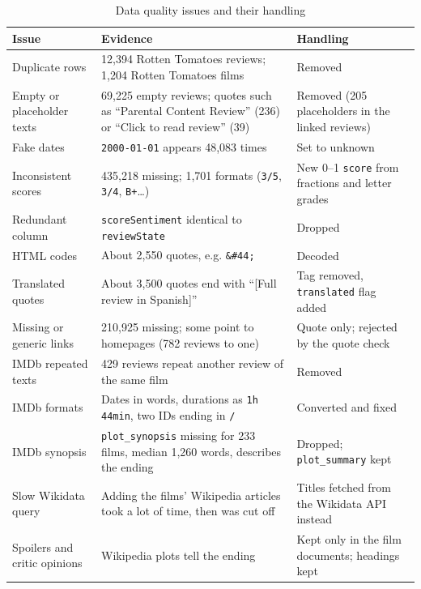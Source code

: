 \begin{table}
  \centering
  \caption{Data quality issues and their handling}
  \label{tab:quality}
  \small
  \begin{tabularx}{\textwidth}{lXX}
    \toprule
    Issue & Evidence & Handling \\
    \midrule
    Duplicate rows & 12,394 Rotten Tomatoes reviews; 1,204 Rotten Tomatoes films & Removed \\
    Empty or placeholder texts & 69,225 empty reviews; quotes such as ``Parental Content Review'' (236) or ``Click to read review'' (39) & Removed (205 placeholders in the linked reviews) \\
    Fake dates & \texttt{2000-01-01} appears 48,083 times & Set to unknown\\
    Inconsistent scores & 435,218 missing; 1,701 formats (\texttt{3/5}, \texttt{3/4}, \texttt{B+}\ldots) & New 0--1 \texttt{score} from fractions and letter grades \\
    Redundant column & \texttt{scoreSentiment} identical to \texttt{reviewState} & Dropped \\
    HTML codes & About 2,550 quotes, e.g. \texttt{\&\#44;} & Decoded \\
    Translated quotes & About 3,500 quotes end with ``[Full review in Spanish]'' & Tag removed, \texttt{translated} flag added \\
    Missing or generic links & 210,925 missing; some point to homepages (782 reviews to one) & Quote only; rejected by the quote check \\
    IMDb repeated texts & 429 reviews repeat another review of the same film & Removed \\
    IMDb formats & Dates in words, durations as \texttt{1h 44min}, two IDs ending in \texttt{/} & Converted and fixed \\
    IMDb synopsis & \texttt{plot_synopsis} missing for 233 films, median 1,260 words, describes the ending & Dropped; \texttt{plot_summary} kept \\
    Slow Wikidata query & Adding the films' Wikipedia articles took a lot of time, then was cut off & Titles fetched from the Wikidata API instead \\
    Spoilers and critic opinions & Wikipedia plots tell the ending & Kept only in the film documents; headings kept \\
    \bottomrule
  \end{tabularx}
\end{table}

